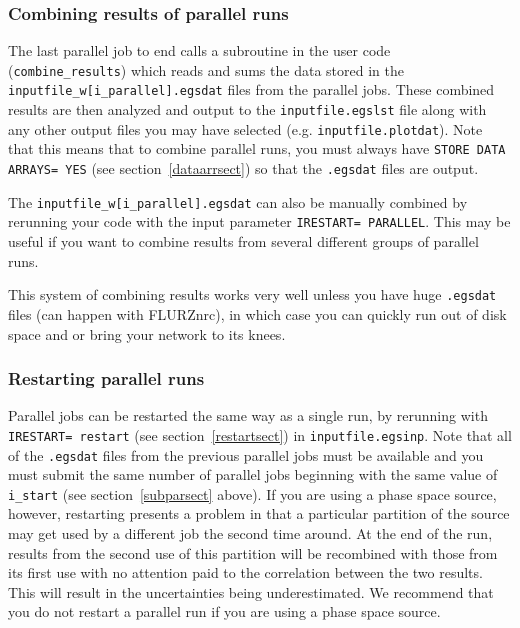 \documentclass[12pt,twoside]{article}  %
\begin{document}
\subsubsection{Combining results of parallel runs}

The last parallel job to end calls a subroutine in the user code
({\tt combine\_results})
which reads and sums the data stored in the
{\tt inputfile\_w[i\_parallel].egsdat} files from the parallel jobs.
These combined results are then analyzed and output
to the {\tt inputfile.egslst} file along with any other output files
you may have selected (e.g. {\tt inputfile.plotdat}).  Note that this
means that to combine parallel runs, you must always have
{\tt STORE DATA ARRAYS= YES} (see section~\ref{dataarrsect}) so that
the {\tt .egsdat} files are output.

The {\tt inputfile\_w[i\_parallel].egsdat} can also be manually combined
by rerunning your code with the input parameter
\verb+IRESTART= PARALLEL+.  This may be useful if you want to combine
results from several different groups of parallel runs.

This system of combining results works very well unless you have
huge {\tt .egsdat}
files (can happen with FLURZnrc), in which case you can quickly run out of
disk space and or bring your network to its knees.

\subsubsection{Restarting parallel runs}

Parallel jobs can be restarted the same way as a single run, by
rerunning with {\tt IRESTART= restart} (see section~\ref{restartsect})
in {\tt inputfile.egsinp}.
Note that all of the {\tt .egsdat} files from the previous parallel
jobs must be available and you must submit the same number of parallel
jobs beginning with the same value of {\tt i\_start} (see section~\ref{subparsect} above).
If you are using a
phase space source, however, restarting presents a problem in that a
particular partition of the source may get used by a different job the
second time around.  At the end of the run, results from the second
use of this partition will be recombined with those from its first use
with no attention paid to the correlation between the two results.  This
will result in the uncertainties being underestimated.  We recommend that
you do not restart a parallel run if you are using a phase space source.
\end{document}
